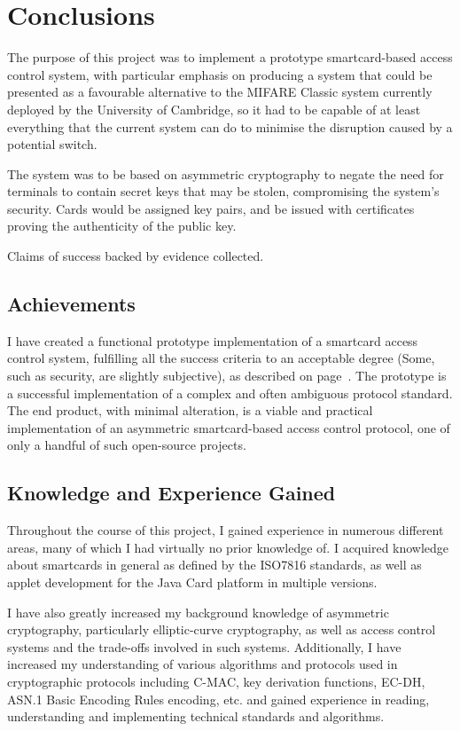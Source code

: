 \documentclass[12pt]{article}
\begin{document}
\pagebreak
\section{Conclusions}
The purpose of this project was to implement a prototype smartcard-based access control system, with particular emphasis on producing a system that could be presented as a favourable alternative to the MIFARE Classic system currently deployed by the University of Cambridge, so it had to be capable of at least everything that the current system can do to minimise the disruption caused by a potential switch.

The system was to be based on asymmetric cryptography to negate the need for terminals to contain secret keys that may be stolen, compromising the system's security. Cards would be assigned key pairs, and be issued with certificates proving the authenticity of the public key.


Claims of success backed by evidence collected.

\subsection{Achievements}
I have created a functional prototype implementation of a smartcard access control system, fulfilling all the success criteria to an acceptable degree (Some, such as security, are slightly subjective), as described on page~\pageref{sec:success_criteria}. The prototype is a successful implementation of a complex and often ambiguous protocol standard. The end product, with minimal alteration, is a viable and practical implementation of an asymmetric smartcard-based access control protocol, one of only a handful of such open-source projects.


\subsection{Knowledge and Experience Gained}
Throughout the course of this project, I gained experience in numerous different areas, many of which I had virtually no prior knowledge of. I acquired knowledge about smartcards in general as defined by the ISO7816 standards, as well as applet development for the Java Card platform in multiple versions.

I have also greatly increased my background knowledge of asymmetric cryptography, particularly elliptic-curve cryptography, as well as access control systems and the trade-offs involved in such systems. Additionally, I have increased my understanding of various algorithms and protocols used in cryptographic protocols including C-MAC, key derivation functions, EC-DH, ASN.1 Basic Encoding Rules encoding, etc. and gained experience in reading, understanding and implementing technical standards and algorithms.
\end{document}
